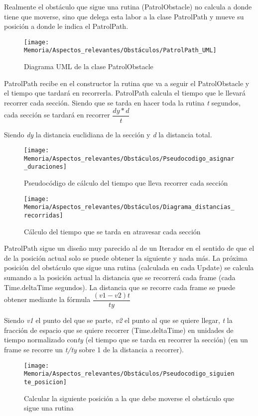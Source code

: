 Realmente el obstáculo que sigue una rutina (PatrolObstacle) no calcula a donde tiene que moverse, sino que delega esta labor a la clase PatrolPath y mueve su posición a donde le indica el PatrolPath.

\begin{figure}[h]
\centering
\texttt{[image: Memoria/Aspectos\_relevantes/Obstáculos/PatrolPath\_UML]}
\caption{Diagrama UML de la clase PatrolObstacle}
\end{figure}

PatrolPath recibe en el constructor la rutina que va a seguir el PatrolObstacle y el tiempo que tardará en recorrerla. PatrolPath calcula el tiempo que le llevará recorrer cada sección. Siendo que se tarda en hacer toda la rutina \textit{t} segundos, cada sección se tardará en recorrer $\dfrac{dy*d}{t}$

Siendo \textit{dy} la distancia euclidiana de la sección y \textit{d} la distancia total.

\begin{figure}[h]
\centering
\texttt{[image: Memoria/Aspectos\_relevantes/Obstáculos/Pseudocodigo\_asignar\_duraciones]}
\caption{Pseudocódigo de cálculo del tiempo que lleva recorrer cada sección}
\end{figure}

\clearpage
\begin{figure}[h]
\centering
\texttt{[image: Memoria/Aspectos\_relevantes/Obstáculos/Diagrama\_distancias\_recorridas]}
\caption{Cálculo del tiempo que se tarda en atravesar cada sección}
\end{figure}

PatrolPath sigue un diseño muy parecido al de un Iterador en el sentido de que el de la posición actual solo se puede obtener la siguiente y nada más.
La próxima posición del obstáculo que sigue una rutina (calculada en cada Update) se calcula sumando a la posición actual la distancia que se recorrerá cada frame (cada Time.deltaTime segundos).
La distancia que se recorre cada frame se puede obtener mediante la fórmula $\dfrac{(v1-v2)t}{ty}$

Siendo \textit{v1} el punto del que se parte, \textit{v2} el punto al que se quiere llegar, \textit{t} la fracción de espacio que se quiere recorrer (Time.deltaTime) en unidades de tiempo normalizado con\textit{ty} (el tiempo que se tarda en recorrer la sección) (en un frame se recorre un \textit{t/ty} sobre 1 de la distancia a recorrer).

\clearpage
\begin{figure}[h]
\centering
\texttt{[image: Memoria/Aspectos\_relevantes/Obstáculos/Pseudocodigo\_siguiente\_posicion]}
\caption{Calcular la siguiente posición a la que debe moverse el obstáculo que sigue una rutina}
\end{figure}